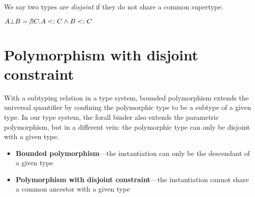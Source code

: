 \documentclass[preprint]{sigplanconf}
\begin{document}
We say two types are \emph{disjoint} if they do not share a common supertype.

\begin{definition}[Disjointness]
$A \bot B = \not \exists C. A <: C \wedge B <: C$
\end{definition}

%
%

\section{Polymorphism with disjoint constraint}

With a subtyping relation in a type system, bounded polymorphism extends the universal quantifier by confining the polymorphic type to be a subtype of a given type. In our type system, the forall binder also extends the parametric polymorphism, but in a different vein: the polymorphic type can only be disjoint with a given type.

\begin{itemize}
  \item \textbf{Bounded polymorphism}---the instantiation can only be the descendant of a given type
  \item \textbf{Polymorphism with disjoint constraint}---the instantiation cannot share a common ancestor with a given type
\end{itemize}
\end{document}
